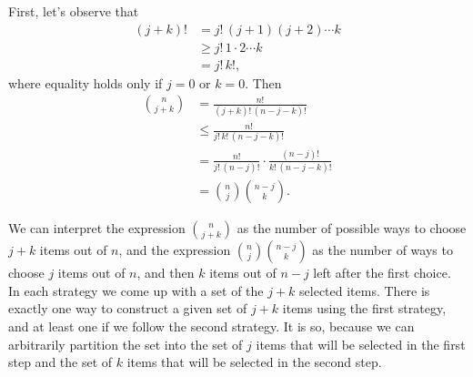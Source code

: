 First, let's observe that
\begin{align*}
    (j+k)! &= j!\,(j+1)(j+2)\cdots k \\
    &\ge j!\,1\cdot2\cdots k \\
    &= j!\,k!,
\end{align*}
where equality holds only if $j=0$ or $k=0$.
Then
\begin{align*}
    \binom{n}{j+k} &= \frac{n!}{(j+k)!\,(n-j-k)!} \\
    &\le \frac{n!}{j!\,k!\,(n-j-k)!} \\[1mm]
    &= \frac{n!}{j!\,(n-j)!}\cdot\frac{(n-j)!}{k!\,(n-j-k)!} \\[1mm]
    &= \binom{n}{j}\binom{n-j}{k}.
\end{align*}

We can interpret the expression $\binom{n}{j+k}$ as the number of possible ways to choose $j+k$ items out of $n$, and the expression $\binom{n}{j}\binom{n-j}{k}$ as the number of ways to choose $j$ items out of $n$, and then $k$ items out of $n-j$ left after the first choice.
In each strategy we come up with a set of the $j+k$ selected items.
There is exactly one way to construct a given set of $j+k$ items using the first strategy, and at least one if we follow the second strategy.
It is so, because we can arbitrarily partition the set into the set of $j$ items that will be selected in the first step and the set of $k$ items that will be selected in the second step.
